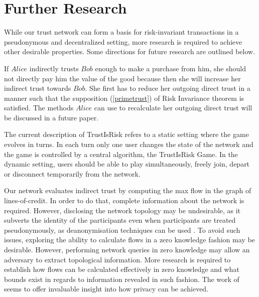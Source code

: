 \section{Further Research}

  While our trust network can form a basis for risk-invariant transactions in a pseudonymous and decentralized setting, more
  research is required to achieve other desirable properties. Some directions for future research are outlined below.

  If $Alice$ indirectly trusts $Bob$ enough to make a purchase from him, she should not directly pay him the value of the
  good because then she will increase her indirect trust towards $Bob$. She first has to reduce her outgoing direct trust in
  a manner such that the supposition (\ref{primetrust}) of Risk Invariance theorem is satisfied. The methods $Alice$ can use
  to recalculate her outgoing direct trust will be discussed in a future paper.

  The current description of TrustIsRisk refers to a static setting where the game evolves in turns. In each turn only one
  user changes the state of the network and the game is controlled by a central algorithm, the TrustIsRisk Game. In the
  dynamic setting, users should be able to play simultaneously, freely join, depart or disconnect temporarily from the
  network.

  Our network evaluates indirect trust by computing the max flow in the graph of lines-of-credit. In order to do that,
  complete information about the network is required. However, disclosing the network topology may be undesirable, as
  it subverts the identity of the participants even when participants are treated pseudonymously, as deanonymisation
  techniques can be used \cite{deanonymisation}. To avoid such issues, exploring the ability to calculate flows in a
  zero knowledge fashion may be desirable. However, performing network queries in zero knowledge may allow an adversary
  to extract topological information. More research is required to establish how flows can be calculated effectively in
  zero knowledge and what bounds exist in regards to information revealed in such fashion. The work of
  \cite{silentwhispers} seems to offer invaluable insight into how privacy can be achieved.

